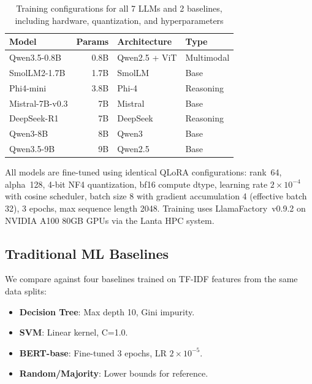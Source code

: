 \documentclass[journal]{IEEEtran}
\begin{document}
\begin{table}[!ht]
\centering
\caption{Training configurations for all 7 LLMs and 2 baselines, including hardware, quantization, and hyperparameters}
\label{tab:models}
\begin{tabular}{lrll}
\toprule
\textbf{Model} & \textbf{Params} & \textbf{Architecture} & \textbf{Type} \\
\midrule
Qwen3.5-0.8B & 0.8B & Qwen2.5 + ViT & Multimodal \\
SmolLM2-1.7B & 1.7B & SmolLM & Base \\
Phi4-mini & 3.8B & Phi-4 & Reasoning \\
Mistral-7B-v0.3 & 7B & Mistral & Base \\
DeepSeek-R1 & 7B & DeepSeek & Reasoning \\
Qwen3-8B & 8B & Qwen3 & Base \\
Qwen3.5-9B & 9B & Qwen2.5 & Base \\
\bottomrule
\end{tabular}
\end{table}

All models are fine-tuned using identical QLoRA configurations: rank~64, alpha~128, 4-bit NF4 quantization, bf16 compute dtype, learning rate $2\times10^{-4}$ with cosine scheduler, batch size 8 with gradient accumulation 4 (effective batch 32), 3 epochs, max sequence length 2048. Training uses LlamaFactory~v0.9.2 on NVIDIA A100 80GB GPUs via the Lanta HPC system.

\subsection{Traditional ML Baselines}
We compare against four baselines trained on TF-IDF features from the same data splits:
\begin{itemize}
\item \textbf{Decision Tree}: Max depth 10, Gini impurity.
\item \textbf{SVM}: Linear kernel, C=1.0.
\item \textbf{BERT-base}: Fine-tuned 3 epochs, LR $2\times10^{-5}$.
\item \textbf{Random/Majority}: Lower bounds for reference.
\end{itemize}
\end{document}
